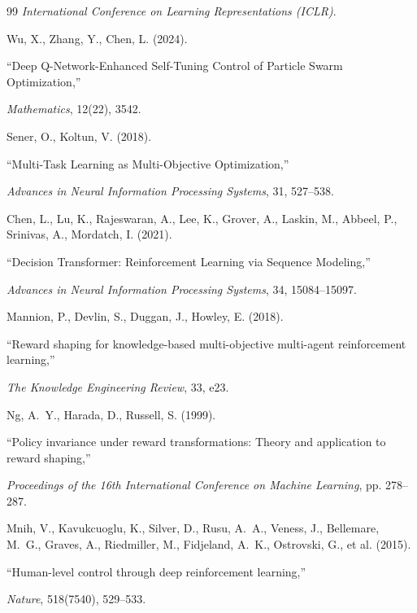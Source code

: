 \documentclass[fleqn,10pt]{wlscirep}
\begin{document}
\begin{thebibliography}{99}
\textit{International Conference on Learning Representations (ICLR)}.


Wu, X., Zhang, Y., Chen, L. (2024).

``Deep Q-Network-Enhanced Self-Tuning Control of Particle Swarm Optimization,''

\textit{Mathematics}, 12(22), 3542.


Sener, O., Koltun, V. (2018).

``Multi-Task Learning as Multi-Objective Optimization,''

\textit{Advances in Neural Information Processing Systems}, 31, 527--538.


Chen, L., Lu, K., Rajeswaran, A., Lee, K., Grover, A., Laskin, M., Abbeel, P., Srinivas, A., Mordatch, I. (2021).

``Decision Transformer: Reinforcement Learning via Sequence Modeling,''

\textit{Advances in Neural Information Processing Systems}, 34, 15084--15097.


Mannion, P., Devlin, S., Duggan, J., Howley, E. (2018).

``Reward shaping for knowledge-based multi-objective multi-agent reinforcement learning,''

\textit{The Knowledge Engineering Review}, 33, e23.


Ng, A.~Y., Harada, D., Russell, S. (1999).

``Policy invariance under reward transformations: Theory and application to reward shaping,''

\textit{Proceedings of the 16th International Conference on Machine Learning}, pp. 278--287.


Mnih, V., Kavukcuoglu, K., Silver, D., Rusu, A.~A., Veness, J., Bellemare, M.~G., Graves, A., Riedmiller, M., Fidjeland, A.~K., Ostrovski, G., et al. (2015).

``Human-level control through deep reinforcement learning,''

\textit{Nature}, 518(7540), 529--533.

\end{thebibliography}
\end{document}
